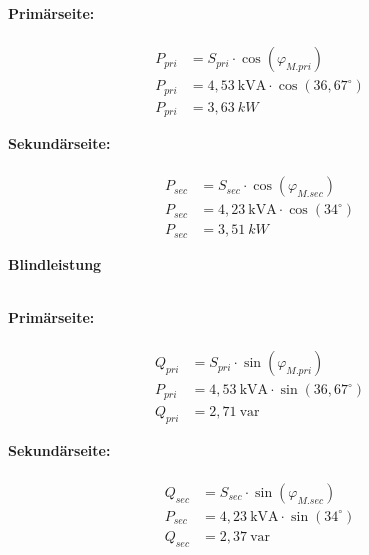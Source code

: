 \begin{enumerate}[label=\alph*)]
\begin{tcolorbox}[colback=gray!30,
			      colframe=black,
			      width=0.9\textwidth,
		      ]
{			      \begin{minipage}{0.5\textwidth}
				      \textbf{Primärseite:}\\ \ \\
				      \begin{align*}
					      P_{pri} & = S_{pri} \cdot \cos(\varphi_{M.pri})      \\
					      P_{pri} & = 4,53\ \text{kVA} \cdot \cos(36,67^\circ) \\
					      P_{pri} & = 3,63\ kW
				      \end{align*}
			      \end{minipage}\hfill
			      \begin{minipage}{0.5\textwidth}
				      \textbf{Sekundärseite:}\\ \ \\
				      \begin{align*}
					      P_{sec} & = S_{sec} \cdot \cos(\varphi_{M.sec})   \\
					      P_{sec} & = 4,23\ \text{kVA} \cdot \cos(34^\circ) \\
					      P_{sec} & = 3,51\ kW
				      \end{align*}
			      \end{minipage}
		      }
	      \end{tcolorbox}

	      \textbf{Blindleistung}\\ \ \\
	      \begin{tcolorbox}[colback=gray!30,
			      colframe=black,
			      width=0.9\textwidth,
		      ]
		      \parbox{\textwidth}{

			      \begin{minipage}{0.5\textwidth}
				      \textbf{Primärseite:}\\ \ \\
				      \begin{align*}
					      Q_{pri} & = S_{pri} \cdot \sin(\varphi_{M.pri})      \\
					      P_{pri} & = 4,53\ \text{kVA} \cdot \sin(36,67^\circ) \\
					      Q_{pri} & = 2,71\ \text{var}
				      \end{align*}
			      \end{minipage}\hfill
			      \begin{minipage}{0.5\textwidth}
				      \textbf{Sekundärseite:}\\ \ \\
				      \begin{align*}
					      Q_{sec} & = S_{sec} \cdot \sin(\varphi_{M.sec})   \\
					      P_{sec} & = 4,23\ \text{kVA} \cdot \sin(34^\circ) \\
					      Q_{sec} & = 2,37\ \text{var}
				      \end{align*}
			      \end{minipage}
		      }
	      \end{tcolorbox}


\end{enumerate}
